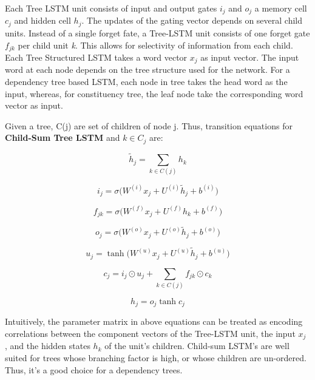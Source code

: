 Each Tree LSTM unit consists of input and output gates ${i}_{j}$ and ${o}_{j}$ a memory cell ${c}_{j}$ and hidden cell ${h}_{j}$. The updates of the gating vector depends on several child units. Instead of a single forget fate, a Tree-LSTM unit consists of one forget gate ${f}_{jk}$ per child unit \textit{k}. This allows for selectivity of information from each child. Each Tree Structured LSTM takes a word vector ${x}_{j}$ as input vector. The input word at each node depends on the tree structure used for the network. For a dependency tree based LSTM, each node in tree takes the head word as the input, whereas, for constituency tree, the leaf node take the corresponding word vector as input.

Given a tree, C(j) are set of children of node j. Thus, transition equations for \textbf{Child-Sum Tree LSTM} and $k \in {C}_{j}$ are: 

\begin{equation}
{\tilde{h}}_{j} =  \sum_{k \in C(j)} {h}_{k} 
\end{equation}

\begin{equation}
{i}_{j} = \sigma  \big(   {W}^{(i)} {x}_{j} + {U}^{(i)} {\tilde{h}}_{j} +    {b}^{(i)}   \big)  
\end{equation}

\begin{equation}
{f}_{jk} = \sigma  \big(   {W}^{(f)} {x}_{j} + {U}^{(f)} {h}_{k} +    {b}^{(f)}   \big)  
\end{equation}

\begin{equation}
{o}_{j} = \sigma  \big(   {W}^{(o)} {x}_{j} + {U}^{(o)} {\tilde{h}}_{j} +    {b}^{(o)}   \big)  
\end{equation}

\begin{equation}
{u}_{j} = \tanh  \big(   {W}^{(u)} {x}_{j} + {U}^{(u)} {\tilde{h}}_{j} +    {b}^{(u)}   \big)  
\end{equation}

\begin{equation}
{c}_{j} = {i}_{j}  \odot  {u}_{j} +  \sum_{k \in C(j)} {f}_{jk}  \odot   {c}_{k}    
\end{equation}

\begin{equation}
{h}_{j} = {o}_{j} \tanh {c}_{j}    
\end{equation}


Intuitively,  the parameter matrix in above equations can be treated as encoding correlations between the component vectors of the Tree-LSTM unit, the input ${x}_{j}$ , and the hidden states ${h}_{k}$ of the unit’s children. Child-sum LSTM's are well suited for trees whose branching factor is high, or whose children are un-ordered. Thus, it's a good choice for a dependency trees.

